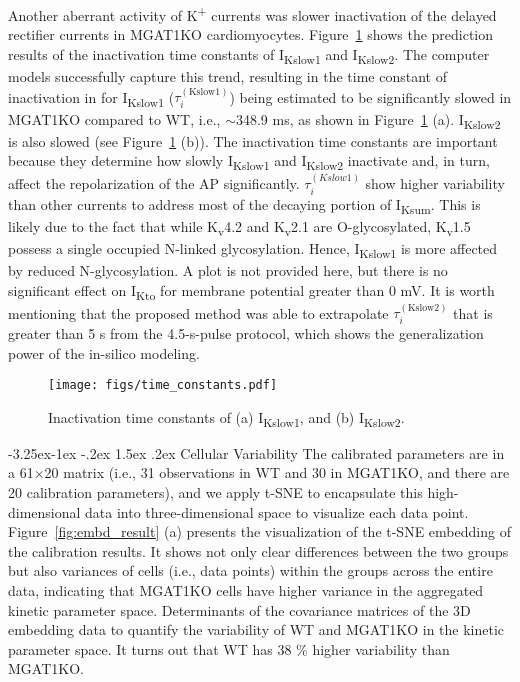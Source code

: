\documentclass[11pt]{article}
\makeatletter
\renewcommand\subsection{\@startsection{subsection}{2}{\z@}%
                                     {-3.25ex\@plus -1ex \@minus -.2ex}%
                                     {1.5ex \@plus .2ex}%
                                     {\normalfont\fontfamily{phv}\fontsize{14}{17}\bfseries}}
\makeatother
\begin{document}
Another aberrant activity of K\textsuperscript{+} currents was slower inactivation of the delayed rectifier currents in MGAT1KO cardiomyocytes. Figure~\ref{fig:time_constants} shows the prediction results of the inactivation time constants of I\textsubscript{Kslow1} and I\textsubscript{Kslow2}. The computer models successfully capture this trend, resulting in the time constant of inactivation in for I\textsubscript{Kslow1} ($\tau_{i}^{(\mathrm{Kslow1})}$) being estimated to be significantly slowed in MGAT1KO compared to WT, i.e., $\sim$348.9 ms, as shown in Figure~\ref{fig:time_constants} (a). I\textsubscript{Kslow2} is also slowed (see Figure~\ref{fig:time_constants} (b)). The inactivation time constants are important because they determine how slowly I\textsubscript{Kslow1} and I\textsubscript{Kslow2} inactivate and, in turn, affect the repolarization of the AP significantly. $\tau_{i}^{(Kslow1)}$ show higher variability than other currents to address most of the decaying portion of I\textsubscript{Ksum}. This is likely due to the fact that while K\textsubscript{v}4.2 and K\textsubscript{v}2.1 are O-glycosylated, K\textsubscript{v}1.5 possess a single occupied N-linked glycosylation. Hence, I\textsubscript{Kslow1} is more affected by reduced N-glycosylation. A plot is not provided here, but there is no significant effect on I\textsubscript{Kto} for membrane potential greater than 0 mV. It is worth mentioning that the proposed method was able to extrapolate $\tau_{i}^{(\mathrm{Kslow2})}$ that is greater than 5 s from the 4.5-s-pulse protocol, which shows the generalization power of the in-silico modeling.
\begin{figure}[!ht]
    \centering
    \texttt{[image: figs/time\_constants.pdf]}
    \caption{Inactivation time constants of (a) I\textsubscript{Kslow1}, and (b) I\textsubscript{Kslow2}.}
    \label{fig:time_constants}
\end{figure}

\subsection{Cellular Variability}
The calibrated parameters are in a 61×20 matrix (i.e., 31 observations in WT and 30 in MGAT1KO, and there are 20 calibration parameters), and we apply t-SNE to encapsulate this high-dimensional data into three-dimensional space to visualize each data point. Figure~\ref{fig:embd_result} (a) presents the visualization of the t-SNE embedding of the calibration results. It shows not only clear differences between the two groups but also variances of cells (i.e., data points) within the groups across the entire data, indicating that MGAT1KO cells have higher variance in the aggregated kinetic parameter space. Determinants of the covariance matrices of the 3D embedding data to quantify the variability of WT and MGAT1KO in the kinetic parameter space. It turns out that WT has 38 \% higher variability than MGAT1KO. 
\end{document}

